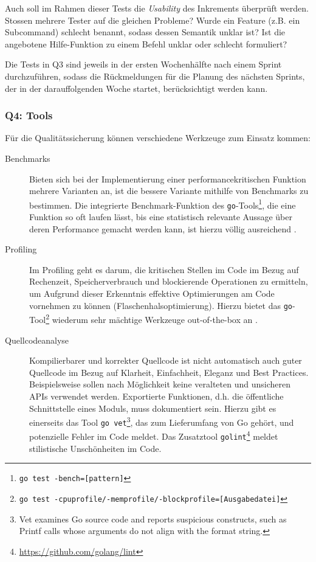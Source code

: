 Auch soll im Rahmen dieser Tests die \textit{Usability} des Inkrements überprüft werden. Stossen mehrere Tester auf die gleichen Probleme? Wurde ein Feature (z.B. ein Subcommand) schlecht benannt, sodass dessen Semantik unklar ist? Ist die angebotene Hilfe-Funktion zu einem Befehl unklar oder schlecht formuliert?

Die Tests in Q3 sind jeweils in der ersten Wochenhälfte nach einem Sprint durchzuführen, sodass die Rückmeldungen für die Planung des nächsten Sprints, der in der darauffolgenden Woche startet, berücksichtigt werden kann.

\subsubsection{Q4: Tools}

Für die Qualitätssicherung können verschiedene Werkzeuge zum Einsatz kommen:

\begin{description}
	\item[Benchmarks] Bieten sich bei der Implementierung einer performancekritischen Funktion mehrere Varianten an, ist die bessere Variante mithilfe von Benchmarks zu bestimmen. Die integrierte Benchmark-Funktion des \texttt{go}-Tools\footnote{\texttt{go test -bench=[pattern]}}, die eine Funktion so oft laufen lässt, bis eine statistisch relevante Aussage über deren Performance gemacht werden kann, ist hierzu völlig ausreichend \cite[S. 321]{gopl}.
	\item[Profiling] Im Profiling geht es darum, die kritischen Stellen im Code im Bezug auf Rechenzeit, Speicherverbrauch und blockierende Operationen zu ermitteln, um Aufgrund dieser Erkenntnis effektive Optimierungen am Code vornehmen zu können (Flaschenhalsoptimierung). Hierzu bietet das \texttt{go}-Tool\footnote{\texttt{go test -cpuprofile/-memprofile/-blockprofile=[Ausgabedatei]}} wiederum sehr mächtige Werkzeuge out-of-the-box an \cite[S. 324]{gopl}.
	\item[Quellcodeanalyse] Kompilierbarer und korrekter Quellcode ist nicht automatisch auch guter Quellcode im Bezug auf Klarheit, Einfachheit, Eleganz und Best Practices. Beispielsweise sollen nach Möglichkeit keine veralteten und unsicheren APIs verwendet werden. Exportierte Funktionen, d.h. die öffentliche Schnittstelle eines Moduls, muss dokumentiert sein. Hierzu gibt es einerseits das Tool \texttt{go vet}\footnote{Vet examines Go source code and reports suspicious constructs, such as Printf calls whose arguments do not align with the format string.}, das zum Lieferumfang von Go gehört, und potenzielle Fehler im Code meldet. Das Zusatztool \texttt{golint}\footnote{\url{https://github.com/golang/lint}} meldet stilistische Unschönheiten im Code.
\end{description}

